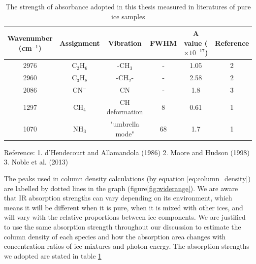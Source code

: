 \begin{table}[htbp]
\caption{The strength of absorbance adopted in this thesis measured in literatures of pure ice samples}
\label{tab:Absorbance}
\begin{tabular}{cccccc}
\hline
\hline
Wavenumber (cm$^{-1}$) & Assignment  & Vibration & FWHM & A value ($\times 10^{-17}$) & Reference \\
\hline
2976 &  C$_2$H$_6$ & -CH$_3$ & - & 1.05 & 2 \\
2960 & C$_3$H$_8$ & -CH$_2$- & - & 2.58 & 2 \\
2086 & CN$^-$ & CN & - & 1.8 & 3 \\
1297 & CH$_4$ & CH deformation & 8 & 0.61 & 1 \\
1070 & NH$_3$ & "umbrella mode" & 68 & 1.7 & 1 \\
\hline
\end{tabular}
Reference: 1. d'Hendecourt and Allamandola (1986)\cite{d1986time} 2. Moore and Hudson (1998)\cite{moore1998infrared} 3. Noble et al. (2013) \cite{noble2012thermal}
\end{table}

The peaks used in column density calculations (by equation \ref{eq:column_density}) are labelled by dotted lines in the graph (figure\ref{fig:widerange}). We are aware that IR absorption strengths can vary depending on its environment, which means it will be different when it is pure, when it is mixed with other ices, and will vary with the relative proportions between ice components. We are justified to use the same absorption strength throughout our discussion to estimate the column density of each species and how the absorption area changes with concentration ratios of ice mixtures and photon energy. The absorption strengths we adopted are stated in table \ref{tab:Absorbance} \\

